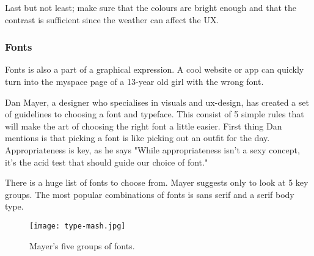 Last but not least; make sure that the colours are bright enough and that the contrast is sufficient since the weather can affect the UX. \cite{Graphic}

\subsubsection{Fonts}
Fonts is also a part of a graphical expression. A cool website or app can quickly turn into the myspace page of a 13-year old girl with the wrong font.

Dan Mayer, a designer who specialises in visuals and ux-design, has created a set of guidelines to choosing a font and typeface. This consist of 5 simple rules that will make the art of choosing the right font a little easier. First thing Dan mentions is that picking a font is like picking out an outfit for the day. Appropriateness is key,  as he says "While appropriateness isn't a sexy concept, it's the acid test that should guide our choice of font." \cite{Font}

There is a huge list of fonts to choose from. Mayer suggests only to look at 5 key groups.
The most popular combinations of fonts is sans serif and a serif body type. \cite{TypeComb} 

\begin{figure}[H]
\centering
\texttt{[image: type-mash.jpg]}
\caption{Mayer's five groups of fonts. \cite{Font}}
\end{figure}

